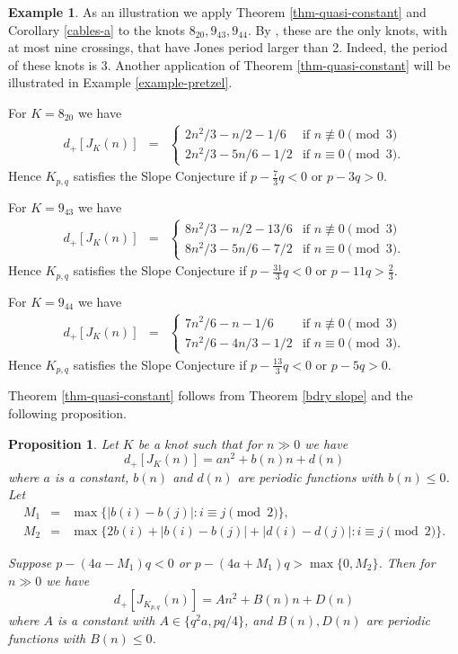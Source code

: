 \documentclass[11pt]{amsart}
\newtheorem{proposition}[theorem]{Proposition}
\theoremstyle{definition}
\newtheorem{example}[theorem]{Example}
\newcommand{\K}{{K_{p, q}}}
\begin{document}
 \begin{example}  

\label{3-knots} As an illustration we apply 
 Theorem \ref{thm-quasi-constant} and Corollary \ref{cables-a}  to the knots  $8_{20}, 9_{43}, 9_{44}$.  By  \cite[Section 4]{Ga-slope},
 these are the only  knots, with at most nine crossings, that have Jones period larger than 2. Indeed,
 the period of these knots is  $3$. Another application of Theorem \ref{thm-quasi-constant} will be illustrated in Example \ref{example-pretzel}.
 
 For $K=8_{20}$ we have
 \begin{eqnarray*}
d_+[J_K(n)] &=& \begin{cases} 2n^2/3 - n/2 - 1/6 &\mbox{if } n \not\equiv 0 \pmod{3}\\ 
2n^2/3 - 5n/6 -1/2 & \mbox{if } n \equiv 0 \pmod{3}.\end{cases} 
\end{eqnarray*}
Hence $K_{p,q}$ satisfies the Slope Conjecture if $p-\frac{7}{3}q<0$ or $p-3q > 0$.

For $K=9_{43}$ we have
 \begin{eqnarray*}
d_+[J_K(n)] &=& \begin{cases} 8n^2/3 - n/2 - 13/6 &\mbox{if } n \not\equiv 0 \pmod{3}\\ 
8n^2/3 - 5n/6 -7/2 & \mbox{if } n \equiv 0 \pmod{3}.\end{cases}
\end{eqnarray*}
Hence $K_{p,q}$ satisfies the Slope Conjecture if $p-\frac{31}{3}q<0$ or $p - 11q>\frac{2}{3}$.


For $K=9_{44}$ we have
\begin{eqnarray*}
d_+[J_K(n)] &=& \begin{cases} 7n^2/6 - n - 1/6 &\mbox{if } n \not\equiv 0 \pmod{3}\\ 
7n^2/6 - 4n/3 -1/2 & \mbox{if } n \equiv 0 \pmod{3}.\end{cases}
\end{eqnarray*}
Hence $K_{p,q}$ satisfies the Slope Conjecture if $p-\frac{13}{3}q<0$ or $p - 5q > 0 $.
\end{example}

Theorem \ref{thm-quasi-constant} follows from Theorem \ref{bdry slope} and the following proposition.

\begin{proposition}
\label{quasi-constant}
Let $K$ be a knot such that for $n \gg 0$ we have
$$
d_+[J_K(n)]=an^2+b(n)n+d(n)
$$
where $a$ is a constant, $b(n)$ and $d(n)$ are periodic functions with $b(n) \le 0$. Let
\begin{eqnarray*}
M_1 &=&  \max\{|b(i)-b(j)| : i  \equiv j \pmod{2} \},\\
M_2 &=& \max\{2b(i) + |b(i)-b(j)| + |d(i)-d(j)| : i \equiv j \pmod{2}\}.
\end{eqnarray*}

Suppose $p- (4a-M_1)q < 0$ or $p- (4a + M_1)q > \max\{0,M_2\}$. Then for $n \gg 0$ we have
$$d_+[J_{\K}(n)]=An^2+B(n)n+D(n)$$
where $A$ is a constant with $A \in \{q^2a, pq/4\}$, and $B(n), D(n)$ are periodic functions with $B(n) \le 0$.
\end{proposition}
\end{document}
